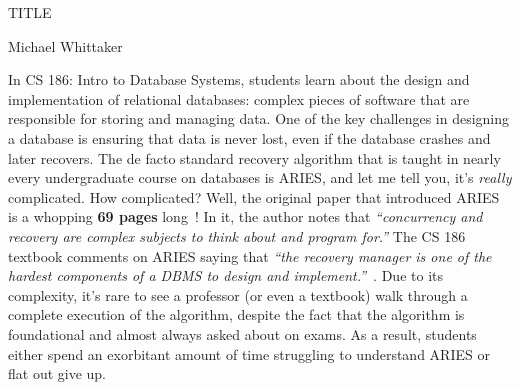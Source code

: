\documentclass[12pt]{article}
\begin{document}
\begin{center}
  {\Large TITLE}

  Michael Whittaker
\end{center}

In CS 186: Intro to Database Systems, students learn about the design and
implementation of relational databases: complex pieces of software that are
responsible for storing and managing data. One of the key challenges in
designing a database is ensuring that data is never lost, even if the database
crashes and later recovers. The de facto standard recovery algorithm that is
taught in nearly every undergraduate course on databases is ARIES, and let me
tell you, it's \emph{really} complicated. How complicated? Well, the original
paper that introduced ARIES is a whopping \textbf{69 pages}
long~\cite{mohan1992aries}! In it, the author notes that \emph{``concurrency
and recovery are complex subjects to think about and program for.''} The CS 186
textbook comments on ARIES saying that \emph{``the recovery manager is one of
the hardest components of a DBMS to design and
implement.''}~\cite{ramakrishnan2000database}. Due to its complexity, it's rare
to see a professor (or even a textbook) walk through a complete execution of
the algorithm, despite the fact that the algorithm is foundational and almost
always asked about on exams. As a result, students either spend an exorbitant
amount of time struggling to understand ARIES or flat out give up.

%
%

{
  \footnotesize
  
  
}
\end{document}
